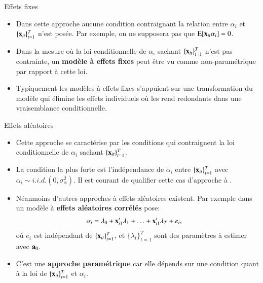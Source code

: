\begin{frame}[allowframebreaks]{Effets fixes}
 \begin{itemize}
\item Dans cette approche aucune condition contraignant la relation entre $\alpha_i$ et $\{{\mathbf x}_{it}\}_{t=1}^T$
 n'est posée. Par exemple, on ne supposera pas que $ \operatorname{E}[{\mathbf x}_{it}\alpha_i] = 0 $.
 \item Dans la mesure où la loi conditionnelle de $\alpha_i$ sachant $\{{\mathbf x}_{it}\}_{t=1}^T$ 
 n'est pas contrainte, un \textbf{modèle à effets fixes} peut être vu comme non-paramétrique par rapport 
 à cette loi.
 \item Typiquement les modèles à effets fixes s'appuient sur une transformation du modèle qui élimine 
 les effets individuels où les rend redondants dans une vraisemblance conditionnelle.
\end{itemize}
\end{frame}
\begin{frame}[allowframebreaks]{Effets aléatoires}
    \begin{itemize}
   \item Cette approche se caractérise par les conditions qui contraignent la loi conditionnelle 
   de $\alpha_i$  sachant $\{{\mathbf x}_{it}\}_{t=1}^T$.
   \item La condition la plus  forte est l'indépendance de $\alpha_i$  entre $\{{\mathbf x}_{it}\}_{t=1}^T$ avec 
   $\alpha_i\sim i.i.d.(0, \sigma_\alpha^2)$. Il est courant de qualifier cette cas d'approche à .
   \item Néanmoins d'autres approches à effets aléatoires existent. Par exemple dans \cite{CHAMBERLAIN19841247} 
   un modèle à \textbf{effets aléatoires corrélés} pose:
   \begin{align*}
    \alpha_i &= \lambda_0 + {\mathbf x}_{i1}^\prime \lambda_1 +\ldots +{\mathbf x}_{i1}^\prime \lambda_T + e_i,
   \end{align*}
   où $e_i$ est indépendant de $\{{\mathbf x}_{it}\}_{t=1}^T$, et $\{\lambda_t\}_{t=1}^T$ 
   sont des paramètres à estimer avec ${\mathbf a}_0$.
   \item C'est une \textbf{approche paramétrique} car elle dépends 
   sur une condition quant à la loi de $\{{\mathbf x}_{it}\}_{t=1}^T$ et $\alpha_i$.
\end{itemize}
\end{frame}

